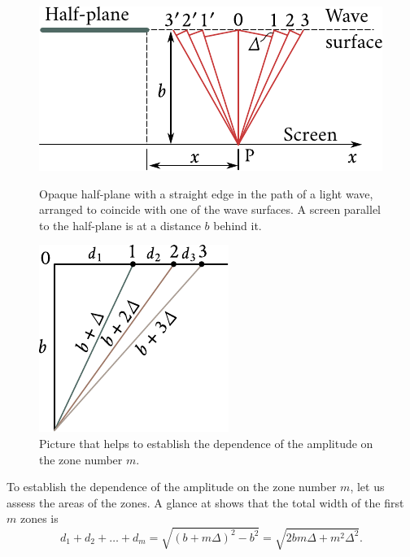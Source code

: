\begin{figure}[t]
	\begin{minipage}[t]{0.58\linewidth}
		\begin{center}
			\includegraphics[scale=0.95]{figures/ch_18/fig_18_15.pdf}
            \caption[]{Opaque half-plane with a straight edge in the path of a light wave, arranged to coincide with one of the wave surfaces. A screen parallel to the half-plane is at a distance $b$ behind it.}
			\label{fig:18_15}
		\end{center}
	\end{minipage}
	\hfill{ }%
	\begin{minipage}[t]{0.38\linewidth}
		\begin{center}
			\includegraphics[scale=0.95]{figures/ch_18/fig_18_16.pdf}
			\caption[]{Picture that helps to establish the dependence of the amplitude on the zone number $m$.}
			\label{fig:18_16}
		\end{center}
	\end{minipage}
\vspace{-0.4cm}
\end{figure}

To establish the dependence of the amplitude on the zone number $m$, let us assess the areas of the zones.
A glance at  shows that the total width of the first $m$ zones is
\begin{equation*}
	d_1 + d_2 + \ldots + d_m = \sqrt{(b+m\Delta)^2 - b^2} = \sqrt{2bm\Delta + m^2\Delta^2}.
\end{equation*}

